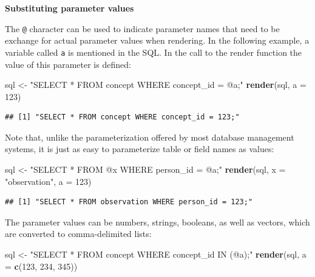 \documentclass[11pt]{book}
\newenvironment{Shaded}{\begin{snugshade}}{\end{snugshade}}
\newcommand{\DataTypeTok}[1]{\textcolor[rgb]{0.13,0.29,0.53}{#1}}
\newcommand{\DecValTok}[1]{\textcolor[rgb]{0.00,0.00,0.81}{#1}}
\newcommand{\KeywordTok}[1]{\textcolor[rgb]{0.13,0.29,0.53}{\textbf{#1}}}
\newcommand{\NormalTok}[1]{#1}
\newcommand{\StringTok}[1]{\textcolor[rgb]{0.31,0.60,0.02}{#1}}
\theoremstyle{definition}
\theoremstyle{definition}
\theoremstyle{definition}
\theoremstyle{remark}
\begin{document}
\textbf{Substituting parameter values}

The \texttt{@} character can be used to indicate parameter names that need to be exchange for actual parameter values when rendering. In the following example, a variable called \texttt{a} is mentioned in the SQL. In the call to the render function the value of this parameter is defined:

\begin{Shaded}
\begin{Highlighting}[]
\NormalTok{sql <-}\StringTok{ "SELECT * FROM concept WHERE concept_id = @a;"}
\KeywordTok{render}\NormalTok{(sql, }\DataTypeTok{a =} \DecValTok{123}\NormalTok{)}
\end{Highlighting}
\end{Shaded}

\begin{verbatim}
## [1] "SELECT * FROM concept WHERE concept_id = 123;"
\end{verbatim}

Note that, unlike the parameterization offered by most database management systems, it is just as easy to parameterize table or field names as values:

\begin{Shaded}
\begin{Highlighting}[]
\NormalTok{sql <-}\StringTok{ "SELECT * FROM @x WHERE person_id = @a;"}
\KeywordTok{render}\NormalTok{(sql, }\DataTypeTok{x =} \StringTok{"observation"}\NormalTok{, }\DataTypeTok{a =} \DecValTok{123}\NormalTok{)}
\end{Highlighting}
\end{Shaded}

\begin{verbatim}
## [1] "SELECT * FROM observation WHERE person_id = 123;"
\end{verbatim}

The parameter values can be numbers, strings, booleans, as well as vectors, which are converted to comma-delimited lists:

\begin{Shaded}
\begin{Highlighting}[]
\NormalTok{sql <-}\StringTok{ "SELECT * FROM concept WHERE concept_id IN (@a);"}
\KeywordTok{render}\NormalTok{(sql, }\DataTypeTok{a =} \KeywordTok{c}\NormalTok{(}\DecValTok{123}\NormalTok{, }\DecValTok{234}\NormalTok{, }\DecValTok{345}\NormalTok{))}
\end{Highlighting}
\end{Shaded}
\end{document}
